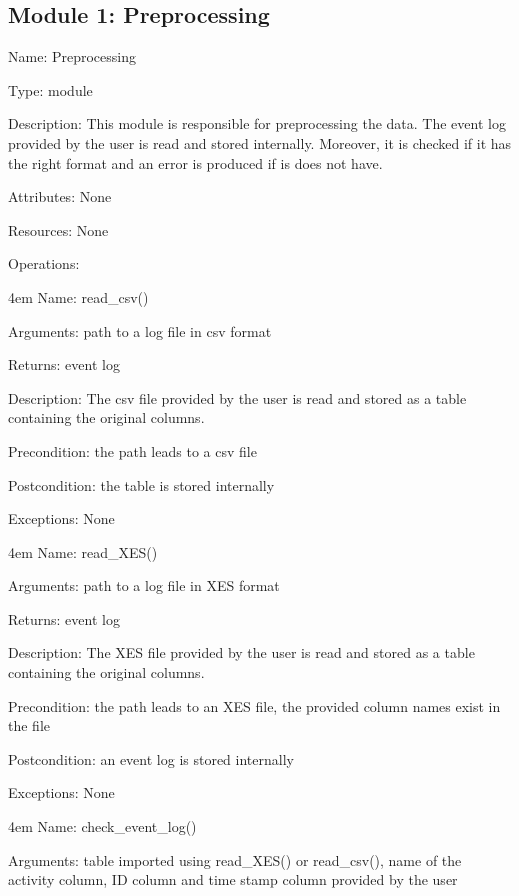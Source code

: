 \documentclass[notitlepage]{article}
\begin{document}
\begin{flushleft}
\subsection{Module 1: Preprocessing}
Name: Preprocessing

Type: module

Description: This module is responsible for preprocessing the data. The event log provided by the user is read and stored internally. Moreover, it is checked if it has the right format and an error is produced if is does not have. 

Attributes: None

Resources: None

Operations: 
\medskip

\par
\begingroup
\leftskip4em
Name: read\_csv()

Arguments: path to a log file in csv format

Returns: event log 

Description: The csv file provided by the user is read and stored as a table containing the original columns.

Precondition: the path leads to a csv file

Postcondition: the table is stored internally

Exceptions: None
\par
\endgroup

\medskip

\par
\begingroup
\leftskip4em
Name: read\_XES()

Arguments: path to a log file in XES format

Returns: event log 

Description: The XES file provided by the user is read and stored as a table containing the original columns.

Precondition: the path leads to an XES file, the provided column names exist in the file

Postcondition: an event log is stored internally

Exceptions: None
\par
\endgroup

\medskip

\par
\begingroup
\leftskip4em
Name: check\_event\_log()

Arguments: table imported using read\_XES() or read\_csv(),  name of the activity column, ID column and time stamp column provided by the user


\end{flushleft}
\end{document}
